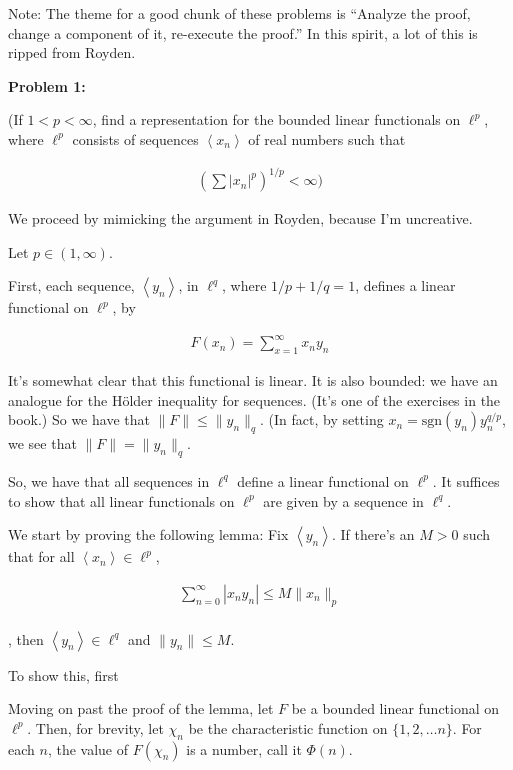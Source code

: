 \documentclass[a4paper,12pt]{article}
\newcommand{\tab}{\hspace{4mm}} %
\newcommand{\absval}[1]{\left\lvert #1 \right\rvert}
\newcommand{\norm}[1]{\|#1\|}
\newcommand{\anbrack}[1]{\left\langle #1 \right\rangle}
\begin{document}
Note: The theme for a good chunk of these problems is ``Analyze the proof, change a component of it, re-execute the proof.'' In this spirit, a lot of this is ripped from Royden.

{\bf Problem 1:} %

(If $1 < p < \infty$, find a representation for the bounded linear functionals on $\ell^p$, where $\ell^p$ consists of sequences $\anbrack{x_n}$ of real numbers such that

\begin{align*}
(\sum\absval{x_n}^p)^{1/p}<\infty ) 
\end{align*}

We proceed by mimicking the argument in Royden, because I'm uncreative.

Let $p \in (1,\infty)$.

First, each sequence, $\anbrack{y_n}$, in $\ell^q$, where $1/p + 1/q = 1$, defines a linear functional on $\ell^p$, by

\begin{align*}
F(x_n)= \sum\limits_{x=1}^\infty x_ny_n
\end{align*}

It's somewhat clear that this functional is linear. It is also bounded: we have an analogue for the H{\"o}lder inequality for sequences. (It's one of the exercises in the book.) So we have that $\norm{F} \leq \norm{y_n}_q$. (In fact, by setting $x_n = \text{sgn}(y_n) y_n^{q/p}$, we see that $\norm{F} = \norm{y_n}_q$.

So, we have that all sequences in $\ell^q$ define a linear functional on $\ell^p$. It suffices to show that all linear functionals on $\ell^p$ are given by a sequence in $\ell^q$.

We start by proving the following lemma: Fix $\anbrack{y_n}$. If there's an $M >0$ such that for all $\anbrack{x_n} \in \ell^p$,

\begin{align*}
\sum\limits_{n=0}^\infty \absval{x_ny_n} \leq M\norm{x_n}_p\\
\end{align*}

, then $\anbrack{y_n} \in \ell^q$ and $\norm{y_n} \leq M$.

\tab To show this, first %

Moving on past the proof of the lemma, let $F$ be a bounded linear functional on $\ell^p$. Then, for brevity, let $\chi_n$ be the characteristic function on $\{1,2, \ldots n\}$. For each $n$, the value of $F(\chi_n)$ is a number, call it $\Phi(n)$.
\end{document}

